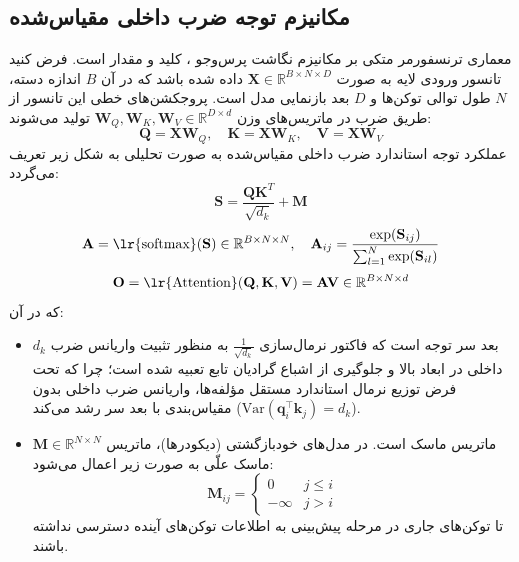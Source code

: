\documentclass[12pt,a4paper]{report}
\theoremstyle{definition}
\begin{document}
\subsection{مکانیزم توجه ضرب داخلی مقیاس‌شده }
معماری ترنسفورمر متکی بر مکانیزم نگاشت پرس‌وجو ، کلید  و مقدار  است. فرض کنید تانسور ورودی لایه به صورت $\mathbf{X} \in \mathbb{R}^{B \times N \times D}$ داده شده باشد که در آن $B$ اندازه دسته، $N$ طول توالی توکن‌ها و $D$ بعد بازنمایی مدل است. پروجکشن‌های خطی این تانسور از طریق ضرب در ماتریس‌های وزن $\mathbf{W}_Q, \mathbf{W}_K, \mathbf{W}_V \in \mathbb{R}^{D \times d}$ تولید می‌شوند:
\begin{equation}
\mathbf{Q} = \mathbf{X}\mathbf{W}_Q, \quad \mathbf{K} = \mathbf{X}\mathbf{W}_K, \quad \mathbf{V} = \mathbf{X}\mathbf{W}_V
\end{equation}
عملکرد توجه استاندارد ضرب داخلی مقیاس‌شده به صورت تحلیلی به شکل زیر تعریف می‌گردد:
\begin{equation}
\mathbf{S} = \frac{\mathbf{Q}\mathbf{K}^T}{\sqrt{d_k}} + \mathbf{M}
\end{equation}
\begin{equation}
\mathbf{A} = \text{\lr{softmax}}(\mathbf{S}) \in \mathbb{R}^{B \times N \times N}, \quad \mathbf{A}_{ij} = \frac{\exp(\mathbf{S}_{ij})}{\sum_{l=1}^N \exp(\mathbf{S}_{il})}
\end{equation}
\begin{equation}
\mathbf{O} = \text{\lr{Attention}}(\mathbf{Q}, \mathbf{K}, \mathbf{V}) = \mathbf{A} \mathbf{V} \in \mathbb{R}^{B \times N \times d}
\end{equation}
که در آن:
\begin{itemize}
    \item $d_k$ بعد سر توجه است که فاکتور نرمال‌سازی $\frac{1}{\sqrt{d_k}}$ به منظور تثبیت واریانس ضرب داخلی در ابعاد بالا و جلوگیری از اشباع گرادیان تابع  تعبیه شده است؛ چرا که تحت فرض توزیع نرمال استاندارد مستقل مؤلفه‌ها، واریانس ضرب داخلی بدون مقیاس‌بندی با بعد سر رشد می‌کند ($\text{Var}(\mathbf{q}_i^\top \mathbf{k}_j) = d_k$).
    \item $\mathbf{M} \in \mathbb{R}^{N \times N}$ ماتریس ماسک است. در مدل‌های خودبازگشتی (دیکودرها)، ماتریس ماسک علّی به صورت زیر اعمال می‌شود:
    \begin{equation}
    \mathbf{M}_{ij} = \begin{cases} 0 & j \le i \\ -\infty & j > i \end{cases}
    \end{equation}
    تا توکن‌های جاری در مرحله پیش‌بینی به اطلاعات توکن‌های آینده دسترسی نداشته باشند.
\end{itemize}
\end{document}
